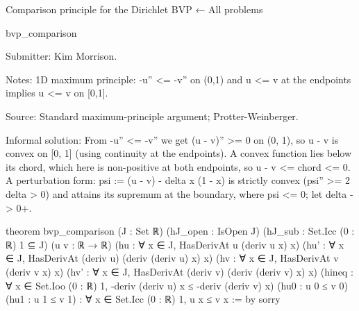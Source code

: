 Comparison principle for the Dirichlet BVP
← All problems

bvp_comparison

Submitter: Kim Morrison.

Notes: 1D maximum principle: -u'' <= -v'' on (0,1) and u <= v at the endpoints implies u <= v on [0,1].

Source: Standard maximum-principle argument; Protter-Weinberger.

Informal solution: From -u'' <= -v'' we get (u - v)'' >= 0 on (0, 1), so u - v is convex on [0, 1] (using continuity at the endpoints). A convex function lies below its chord, which here is non-positive at both endpoints, so u - v <= chord <= 0. A perturbation form: psi := (u - v) - delta x (1 - x) is strictly convex (psi'' >= 2 delta > 0) and attains its supremum at the boundary, where psi <= 0; let delta -> 0+.

theorem bvp_comparison (J : Set ℝ) (hJ_open : IsOpen J) (hJ_sub : Set.Icc (0 : ℝ) 1 ⊆ J)
    (u v : ℝ → ℝ)
    (hu : ∀ x ∈ J, HasDerivAt u (deriv u x) x)
    (hu' : ∀ x ∈ J, HasDerivAt (deriv u) (deriv (deriv u) x) x)
    (hv : ∀ x ∈ J, HasDerivAt v (deriv v x) x)
    (hv' : ∀ x ∈ J, HasDerivAt (deriv v) (deriv (deriv v) x) x)
    (hineq : ∀ x ∈ Set.Ioo (0 : ℝ) 1, -deriv (deriv u) x ≤ -deriv (deriv v) x)
    (hu0 : u 0 ≤ v 0) (hu1 : u 1 ≤ v 1) :
    ∀ x ∈ Set.Icc (0 : ℝ) 1, u x ≤ v x := by
  sorry